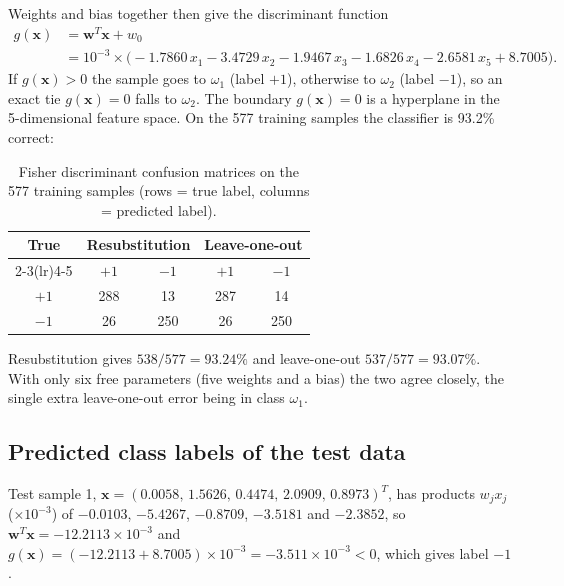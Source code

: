 Weights and bias together then give the discriminant function
\begin{align*}
g(\mathbf{x}) &= \mathbf{w}^T\mathbf{x} + w_0 \\
&= 10^{-3}\times\bigl(-1.7860\,x_1 - 3.4729\,x_2 - 1.9467\,x_3 - 1.6826\,x_4 - 2.6581\,x_5 + 8.7005\bigr).
\end{align*}
If $g(\mathbf{x}) > 0$ the sample goes to $\omega_1$ (label $+1$), otherwise to $\omega_2$ (label $-1$), so an exact tie
$g(\mathbf{x}) = 0$ falls to $\omega_2$. The boundary $g(\mathbf{x}) = 0$ is a hyperplane in the 5-dimensional feature space. On
the 577 training samples the classifier is 93.2\% correct:

\begin{table}[htbp]
\centering
\footnotesize
\caption{Fisher discriminant confusion matrices on the 577 training samples (rows = true label, columns = predicted label).}
\begin{tabular}{@{}ccccc@{}}
\toprule
\multirow{2}{*}{True} & \multicolumn{2}{c}{Resubstitution} & \multicolumn{2}{c}{Leave-one-out} \\
\cmidrule(lr){2-3}\cmidrule(lr){4-5}
 & $+1$ & $-1$ & $+1$ & $-1$ \\
\midrule
$+1$ & 288 & 13 & 287 & 14 \\
$-1$ & 26 & 250 & 26 & 250 \\
\bottomrule
\end{tabular}
\end{table}

Resubstitution gives $538/577 = 93.24\%$ and leave-one-out $537/577 = 93.07\%$. With only six free parameters (five weights and
a bias) the two agree closely, the single extra leave-one-out error being in class $\omega_1$.

\subsection{Predicted class labels of the test data}

Test sample 1, $\mathbf{x} = (0.0058,\, 1.5626,\, 0.4474,\, 2.0909,\, 0.8973)^T$, has products $w_jx_j$
($\times 10^{-3}$) of $-0.0103$, $-5.4267$, $-0.8709$, $-3.5181$ and $-2.3852$, so
$\mathbf{w}^T\mathbf{x} = -12.2113\times10^{-3}$ and
$g(\mathbf{x}) = (-12.2113+8.7005)\times10^{-3} = -3.511\times10^{-3} < 0$, which gives label $-1$.

